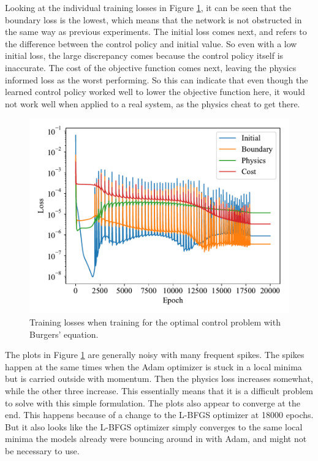 Looking at the individual training losses in Figure \ref{fig:burger_control_losses}, it can be seen that the boundary loss is the lowest, which means that the network is not obstructed in the same way as previous experiments. The initial loss comes next, and refers to the difference between the control policy and initial value. So even with a low initial loss, the large discrepancy comes because the control policy itself is inaccurate. The cost of the objective function comes next, leaving the physics informed loss as the worst performing. So this can indicate that even though the learned control policy worked well to lower the objective function here, it would not work well when applied to a real system, as the physics cheat to get there.

\begin{figure}[H]
    \centering
    \includegraphics[width=1.0\linewidth]{Figures/IntermediateExperiments/OptimalControl/burger_control_losses.pdf}
    \caption{Training losses when training for the optimal control problem with Burgers' equation.}
    \label{fig:burger_control_losses}
\end{figure}

The plots in Figure \ref{fig:burger_control_losses} are generally noisy with many frequent spikes. The spikes happen at the same times when the Adam optimizer is stuck in a local minima but is carried outside with momentum. Then the physics loss increases somewhat, while the other three increase. This essentially means that it is a difficult problem to solve with this simple formulation. The plots also appear to converge at the end. This happens because of a change to the L-BFGS optimizer at 18000 epochs. But it also looks like the L-BFGS optimizer simply converges to the same local minima the models already were bouncing around in with Adam, and might not be necessary to use.

